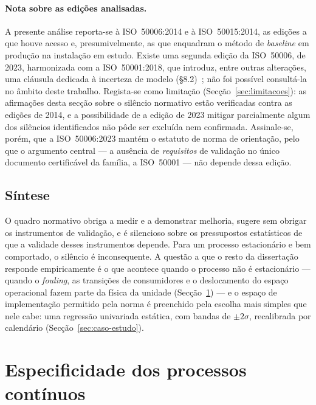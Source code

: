 \paragraph{Nota sobre as edições analisadas.} A presente análise reporta-se à ISO~50006:2014 e à ISO~50015:2014, as edições a que houve acesso e, presumivelmente, as que enquadram o método de \emph{baseline} em produção na instalação em estudo. Existe uma segunda edição da ISO~50006, de 2023, harmonizada com a ISO~50001:2018, que introduz, entre outras alterações, uma cláusula dedicada à incerteza de modelo (\S8.2)~\cite{ISO50006_2023}; não foi possível consultá-la no âmbito deste trabalho. Regista-se como limitação (Secção~\ref{sec:limitacoes}): as afirmações desta secção sobre o silêncio normativo estão verificadas contra as edições de 2014, e a possibilidade de a edição de 2023 mitigar parcialmente algum dos silêncios identificados não pôde ser excluída nem confirmada. Assinale-se, porém, que a ISO~50006:2023 mantém o estatuto de norma de orientação, pelo que o argumento central --- a ausência de \emph{requisitos} de validação no único documento certificável da família, a ISO~50001 --- não depende dessa edição.

\subsection{Síntese}
\label{sec:assimetria-sintese}

O quadro normativo obriga a medir e a demonstrar melhoria, sugere sem obrigar os instrumentos de validação, e é silencioso sobre os pressupostos estatísticos de que a validade desses instrumentos depende. Para um processo estacionário e bem comportado, o silêncio é inconsequente. A questão a que o resto da dissertação responde empiricamente é o que acontece quando o processo não é estacionário --- quando o \emph{fouling}, as transições de consumidores e o deslocamento do espaço operacional fazem parte da física da unidade (Secção~\ref{sec:processos-continuos}) --- e o espaço de implementação permitido pela norma é preenchido pela escolha mais simples que nele cabe: uma regressão univariada estática, com bandas de $\pm 2\sigma$, recalibrada por calendário (Secção~\ref{sec:caso-estudo}).

\section{Especificidade dos processos contínuos}
\label{sec:processos-continuos}

